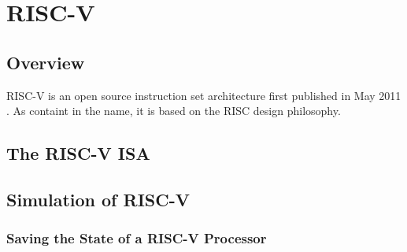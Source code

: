 \chapter{RISC-V}\label{chap:riscv}

\section{Overview}

RISC-V is an open source instruction set architecture first published in May 2011 \cite{first_riscv}. As containt in the name, it is based on the RISC design philosophy.
 

\section{The RISC-V ISA}

\section{Simulation of RISC-V}

\subsection{Saving the State of a RISC-V Processor}\label{statefile}